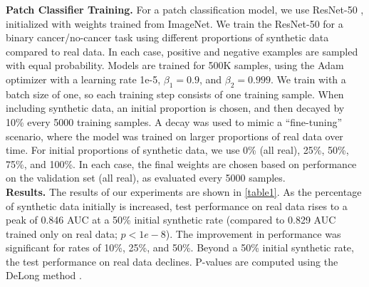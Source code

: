 \documentclass{article}
\begin{document}
\noindent\textbf{Patch Classifier Training.}
For a patch classification model, we use ResNet-50 \cite{resnet}, initialized with weights trained from ImageNet. 
We train the ResNet-50 for a binary cancer/no-cancer task using different proportions of synthetic data compared to real data.
In each case, positive and negative examples are sampled with equal probability.
Models are trained for 500K samples, using the Adam optimizer \cite{adamoptimizer} with a learning rate 1e-5, $\beta_{1}=0.9$, and $\beta_{2}=0.999$. We train with a batch size of one, so each training step consists of one training sample.
When including synthetic data, an initial proportion is chosen, and then decayed by 10\% every 5000 training samples.
A decay was used to mimic a ``fine-tuning'' scenario, where the model was trained on larger proportions of real data over time. 
For initial proportions of synthetic data, we use 0\% (all real), 25\%, 50\%, 75\%, and 100\%.
In each case, the final weights are chosen based on performance on the validation set (all real), as evaluated every 5000 samples.
\\


\noindent\textbf{Results.}
The results of our experiments are shown in \ref{table1}. 
As the percentage of synthetic data initially is increased, test performance on real data rises to a peak of 0.846 AUC at a 50\% initial synthetic rate (compared to 0.829 AUC trained only on real data; $p<1e-8$). The improvement in performance was significant for rates of 10\%, 25\%, and 50\%. Beyond a 50\% initial synthetic rate, the test performance on real data declines. P-values are computed using the DeLong method \cite{delong}.
\\
\end{document}

